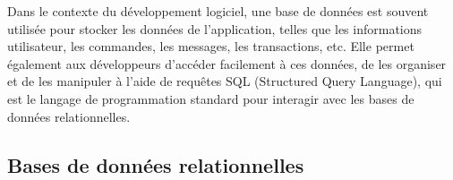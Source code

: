 Dans le contexte du développement logiciel, une base de données est souvent utilisée pour
stocker les données de l'application, telles que les informations utilisateur, les commandes,
les messages, les transactions, etc. Elle permet également aux développeurs d'accéder facilement à
ces données, de les organiser et de les manipuler à l'aide de requêtes SQL (Structured Query Language),
qui est le langage de programmation standard pour interagir avec les bases de données relationnelles.

\subsection{Bases de données relationnelles}\label{subsec:relational-databases}
